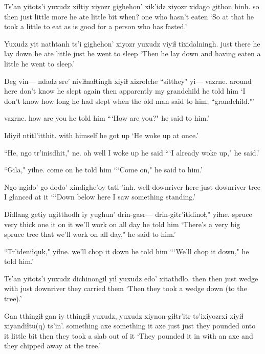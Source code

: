 \documentclass[12pt]{article}
\begin{document}
\gll Ts'an yitots'i yuxudz {xiɬtiy xiyozr} gighehon' {xik'idz xiyozr} xidago {githon hinh}. 
so then just {little more} {he ate} {little bit} when? {one who hasn't eaten}
\glt `So at that he took a little to eat as is good for a person who has fasted.'
\glend

\gll Yuxudz yit nathtanh ts'i gighehon' xiyozr yuxudz {viyiɬ tixidalningh.}
just there {he lay down} {} {he ate} little just {he went to sleep}
\glt `Then he lay down and having eaten a little he went to sleep.'
\glend

\gll Deg vin--- {ndadz sre'} niviɬnaɬtingh xiyiɬ xizrolche ``sitthey" yi--- vazrne. 
{around here} {} {don't know} {he slept again} then apparently {my grandchild} {} {he told him}
\glt `I don't know how long he had slept when the old man said to him, ``grandchild."'
\glend

 vazrne.
{how are you} {he told him}
\glt ```How are you?" he said to him.'
\glend

\gll Idiyiɬ ntitl'itthit.
{with himself} {he got up}
\glt `He woke up at once.'
\glend

\gll ``He, ngo tr'inisdhit," ne. 
oh well {I woke up} {he said}
\glt ```I already woke up," he said.'
\glend

\gll ``Gila," yiɬne.  
{come on} {he told him}
\glt ```Come on," he said to him.'
\glend

\gll Ngo ngido' go dodo' xindighe'oy tatl-'inh. 
well {downriver} here {just downriver} tree {I glanced at it}
\glt ```Down below here I saw something standing.' 
\glend

\gll Didlang getiy ngitthodh iy yughun' drin-gasr--- drin-gitr'itidinoɬ," yiɬne. 
spruce very {thick one} it {on it} {} {we'll work on all day} {he told him}
\glt `There's a very big spruce tree that we'll work on all day," he said to him.'
\glend

\gll ``Tr'ideniɬquk," yiɬne. 
{we'll chop it down} {he told him}
\glt ```We'll chop it down," he told him.'
\glend

\gll Ts'an yitots'i yuxudz dichinongil yiɬ yuxudz edo' xitathdlo. 
then then just wedge with just downriver {they carried them}
\glt `Then they took a wedge down (to the tree).'
\glend

\gll Gan tthingiɬ gan iy tthingiɬ yuxudz, yuxudz xiynon-giɬtr'itr ts'ixiyozrxi xiyiɬ xiyandiɬtu(q) ts'in'. 
something axe something it axe just just {they pounded onto it} {little bit} then {they took a slab out of it} {}
\glt `They pounded it in with an axe and they chipped away at the tree.' 
\glend
\end{document}
